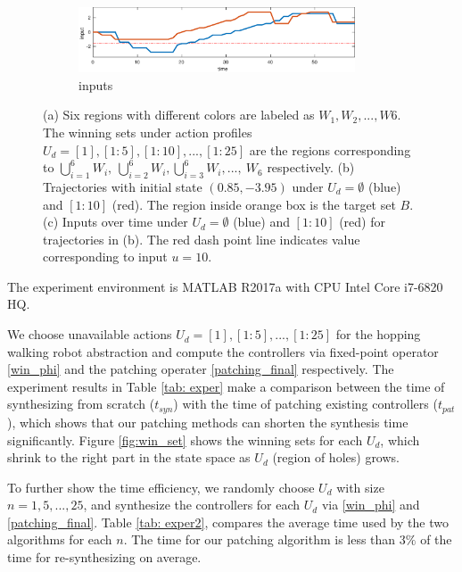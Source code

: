 \begin{figure}
\begin{subfigure}[b]{0.5\textwidth}
		\includegraphics[width=0.9\textwidth]{pic/input}
		\caption{inputs}
		\label{fig:input}
	\end{subfigure}
	\caption{(a) Six regions with different colors are labeled as $ W_1,W_2,...,W6 $. The winning sets under action profiles $U_d = [1], [1:5],[1:10],...,[1:25]$ are the regions corresponding to $ \bigcup_{i=1}^6 W_i,\ \bigcup_{i=2}^6 W_i,\bigcup_{i=3}^6 W_i,...,\ W_6 $ respectively. (b) Trajectories with initial state $ (0.85,-3.95) $ under $ U_d = \emptyset $ (blue) and $[1:10] $ (red). The region inside orange box is the target set $ B $. (c) Inputs over time under $ U_d = \emptyset $ (blue) and $ [1:10] $ (red) for trajectories in (b). The red dash point line indicates value corresponding to input $ u = 10 $.} %
\end{figure}

The experiment environment is MATLAB R2017a with CPU Intel Core  i7-6820 HQ.

We choose unavailable actions $ U_d= [1],[1:5],...,[1:25] $ for the hopping { \color{purple} walking} robot abstraction and compute the controllers via fixed-point operator \eqref{win_phi} and the patching operater \eqref{patching_final} respectively.  The experiment results in Table \ref{tab: exper} make a comparison between the time of synthesizing from scratch ($ t_{syn} $) with the time of patching existing controllers ($ t_{pat} $), which shows that our patching methods can shorten the synthesis time significantly. Figure \ref{fig:win_set} shows the winning sets for each $ U_d $, which shrink to the right part in the state space as $ U_d $ (region of holes) grows.

To further show the time efficiency, we randomly choose $ U_d $ with size $n = 1,5,...,25 $, and synthesize the controllers for each $ U_d $ via \eqref{win_phi} and \eqref{patching_final}. Table \ref{tab: exper2}, compares the average time used by the two algorithms for each $ n $. The time for our patching algorithm is less than $ 3\% $ of the time for re-synthesizing on average.

